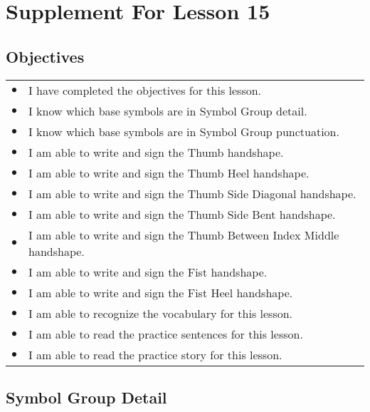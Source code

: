 \documentclass{article}
\begin{document}
\newfontfamily{}
\newfontfamily{}
\newcommand{\bul}{\hfil$\bullet$&}
\renewenvironment{glossary}{\begin{multicols}{5}\begin{center}}{\end{center}\end{multicols}}
\setcounter{secnumdepth}{0}
\setlength{\columnseprule}{1pt}

\section{Supplement For Lesson 15}

\subsection{Objectives}

\begin{tabular}{p{1cm}p{14cm}}
\bul I have completed the objectives for this lesson.\\
\bul I know which base symbols are in Symbol Group detail.\\
\bul I know which base symbols are in Symbol Group punctuation.\\
\bul I am able to write and sign the Thumb handshape.\\
\bul I am able to write and sign the Thumb Heel handshape.\\
\bul I am able to write and sign the Thumb Side Diagonal handshape.\\
\bul I am able to write and sign the Thumb Side Bent handshape.\\
\bul I am able to write and sign the Thumb Between Index Middle handshape.\\
\bul I am able to write and sign the Fist handshape.\\
\bul I am able to write and sign the Fist Heel handshape.\\
\bul I am able to recognize the vocabulary for this lesson.\\
\bul I am able to read the practice sentences for this lesson.\\
\bul I am able to read the practice story for this lesson.\\
\end{tabular}

\subsection{Symbol Group Detail}
\end{document}
